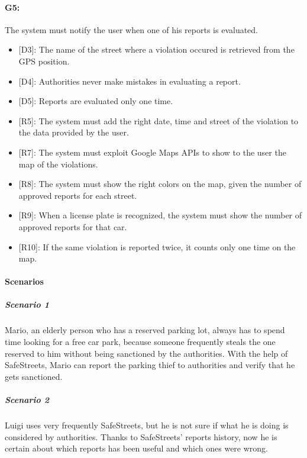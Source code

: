 \documentclass[12pt,a4paper]{report}
\begin{document}
			\paragraph {G5:} The system must notify the user when one of his reports is evaluated.
			\begin{itemize}
				\item{[D3]:} The name of the street where a violation occured is retrieved from the GPS position.
				\item{[D4]:} Authorities never make mistakes in evaluating a report.
				\item{[D5]:} Reports are evaluated only one time.
			\end{itemize}
			\begin{itemize}
				\item{[R5]:} The system must add the right date, time and street of the violation to the data provided by the user.
				\item{[R7]:} The system must exploit Google Maps APIs to show to the user the map of the violations.
				\item{[R8]:} The system must show the right colors on the map, given the number of approved reports for each street.
				\item{[R9]:} When a license plate is recognized, the system must show the number of approved reports for that car.
				\item{[R10]:} If the same violation is reported twice, it counts only one time on the map.
			\end{itemize}

\paragraph{Scenarios}

				\subparagraph{Scenario 1}
					Mario, an elderly person who has a reserved parking lot, always has to spend time looking for a free
					car park, because someone frequently steals the one reserved to him without being sanctioned by the
					authorities. With the help of SafeStreets, Mario can report the parking thief to authorities and verify
					that he gets sanctioned.
					
				\subparagraph{Scenario 2}
					Luigi uses very frequently SafeStreets, but he is not sure if what he is doing is considered by authorities.
					Thanks to SafeStreets' reports history, now he is certain about which reports has been useful and which ones
					were wrong.
					
\end{document}
